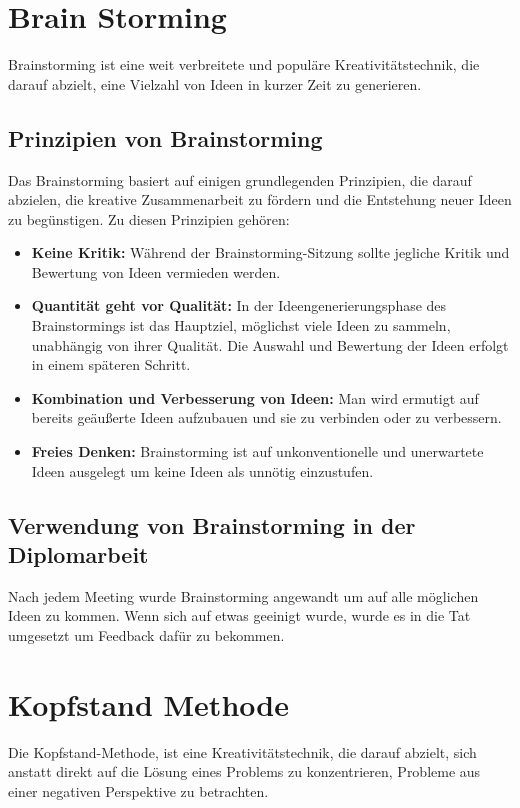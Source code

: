     \section{Brain Storming}

    Brainstorming ist eine weit verbreitete und populäre Kreativitätstechnik, die darauf abzielt, eine Vielzahl von Ideen in kurzer Zeit zu generieren.

    \subsection{Prinzipien von Brainstorming}
    Das Brainstorming basiert auf einigen grundlegenden Prinzipien, die darauf abzielen, die kreative Zusammenarbeit zu fördern und die Entstehung neuer Ideen zu begünstigen. Zu diesen Prinzipien gehören:

    \begin{itemize}
        \item \textbf{Keine Kritik:} Während der Brainstorming-Sitzung sollte jegliche Kritik und Bewertung von Ideen vermieden werden.
        \item \textbf{Quantität geht vor Qualität:} In der Ideengenerierungsphase des Brainstormings ist das Hauptziel, möglichst viele Ideen zu sammeln, unabhängig von ihrer Qualität. Die Auswahl und Bewertung der Ideen erfolgt in einem späteren Schritt.
        \item \textbf{Kombination und Verbesserung von Ideen:} Man wird ermutigt auf bereits geäußerte Ideen aufzubauen und sie zu verbinden oder zu verbessern.
        \item \textbf{Freies Denken:} Brainstorming ist auf unkonventionelle und unerwartete Ideen ausgelegt um keine Ideen als unnötig einzustufen.
    \end{itemize}

    \subsection{Verwendung von Brainstorming in der Diplomarbeit}
    Nach jedem Meeting wurde Brainstorming angewandt um auf alle möglichen Ideen zu kommen. Wenn sich auf etwas geeinigt wurde, wurde es in die Tat umgesetzt um Feedback dafür zu bekommen.

 \pagebreak

    \section{Kopfstand Methode}
    Die Kopfstand-Methode, ist eine Kreativitätstechnik, die darauf abzielt, sich anstatt direkt auf die Lösung eines Problems zu konzentrieren,  Probleme aus einer negativen Perspektive zu betrachten.

